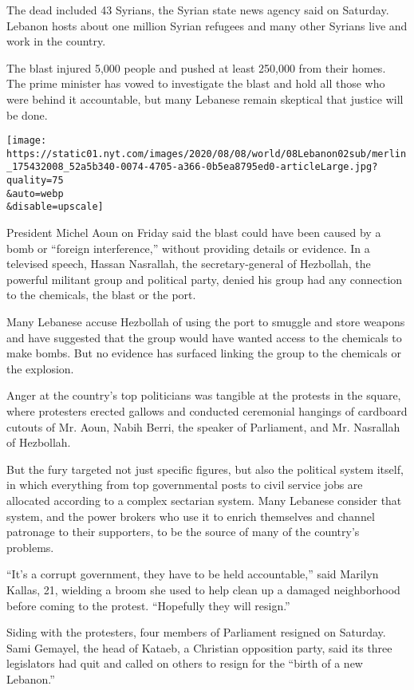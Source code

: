 The dead included 43 Syrians, the Syrian state news agency said on
Saturday. Lebanon hosts about one million Syrian refugees and many other
Syrians live and work in the country.

The blast injured 5,000 people and pushed at least 250,000 from their
homes. The prime minister has vowed to investigate the blast and hold
all those who were behind it accountable, but many Lebanese remain
skeptical that justice will be done.

\texttt{[image: https://static01.nyt.com/images/2020/08/08/world/08Lebanon02sub/merlin\_175432008\_52a5b340-0074-4705-a366-0b5ea8795ed0-articleLarge.jpg?quality=75\\\&auto=webp\\\&disable=upscale]}

President Michel Aoun on Friday said the blast could have been caused by
a bomb or ``foreign interference,'' without providing details or
evidence. In a televised speech, Hassan Nasrallah, the secretary-general
of Hezbollah, the powerful militant group and political party, denied
his group had any connection to the chemicals, the blast or the port.

Many Lebanese accuse Hezbollah of using the port to smuggle and store
weapons and have suggested that the group would have wanted access to
the chemicals to make bombs. But no evidence has surfaced linking the
group to the chemicals or the explosion.

Anger at the country's top politicians was tangible at the protests in
the square, where protesters erected gallows and conducted ceremonial
hangings of cardboard cutouts of Mr. Aoun, Nabih Berri, the speaker of
Parliament, and Mr. Nasrallah of Hezbollah.

But the fury targeted not just specific figures, but also the political
system itself, in which everything from top governmental posts to civil
service jobs are allocated according to a complex sectarian system. Many
Lebanese consider that system, and the power brokers who use it to
enrich themselves and channel patronage to their supporters, to be the
source of many of the country's problems.

``It's a corrupt government, they have to be held accountable,'' said
Marilyn Kallas, 21, wielding a broom she used to help clean up a damaged
neighborhood before coming to the protest. ``Hopefully they will
resign.''

Siding with the protesters, four members of Parliament resigned on
Saturday. Sami Gemayel, the head of Kataeb, a Christian opposition
party, said its three legislators had quit and called on others to
resign for the ``birth of a new Lebanon.''

